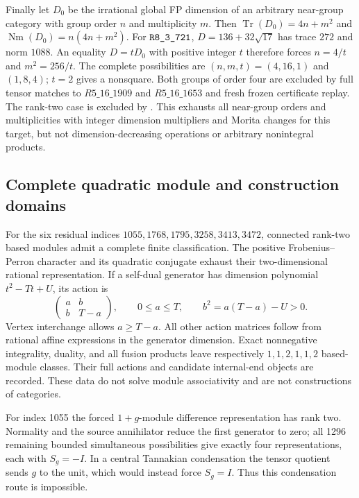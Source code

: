 Finally let $D_0$ be the irrational global FP dimension of an arbitrary
near-group category with group order $n$ and multiplicity $m$. Then
$\operatorname{Tr}(D_0)=4n+m^2$ and
$\operatorname{Nm}(D_0)=n(4n+m^2)$. For $\sha{R8_3_721}$,
$D=136+32\sqrt{17}$ has trace $272$ and norm $1088$.
An equality $D=tD_0$ with positive integer $t$ therefore forces
$n=4/t$ and $m^2=256/t$. The complete possibilities are
$(n,m,t)=(4,16,1)$ and $(1,8,4)$; $t=2$ gives a nonsquare.
Both groups of order four are excluded by full tensor matches to
$R5\_16\_1909$ and $R5\_16\_1653$ and fresh frozen
certificate replay. The rank-two case is excluded by
\cite[Main Theorem]{Ostrik2}.
This exhausts all near-group orders and multiplicities with integer
dimension multipliers and Morita changes for this target, but not
dimension-decreasing operations or arbitrary nonintegral products.

\subsection{Complete quadratic module and construction domains}

For the six residual indices $1055,1768,1795,3258,3413,3472$, connected
rank-two based modules admit a complete finite classification. The
positive Frobenius--Perron character and its quadratic conjugate exhaust
their two-dimensional rational representation. If a self-dual generator
has dimension polynomial $t^2-Tt+U$, its action is
\[
 \begin{pmatrix}a&b\\b&T-a\end{pmatrix},\qquad
 0\leq a\leq T,\qquad b^2=a(T-a)-U>0.
\]
Vertex interchange allows $a\geq T-a$. All other action matrices follow
from rational affine expressions in the generator dimension. Exact
nonnegative integrality, duality, and all fusion products leave respectively
$1,1,2,1,1,2$ based-module classes. Their full actions and candidate
internal-end objects are recorded. These data do not solve module
associativity and are not constructions of categories.

For index 1055 the forced $1+g$-module difference representation has rank
two. Normality and the source annihilator reduce the first generator to
zero; all 1296 remaining bounded simultaneous possibilities give exactly
four representations, each with $S_g=-I$. In a central Tannakian
condensation the tensor quotient sends $g$ to the unit, which would instead
force $S_g=I$. Thus this condensation route is impossible.

